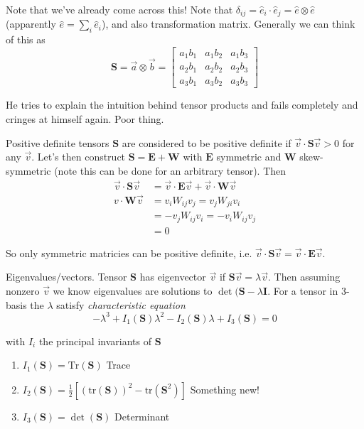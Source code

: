 \documentclass[10pt]{report}
\newcommand{\tr}[0]{\mathrm{tr} }
\begin{document}
Note that we've already come across this! Note that $\delta_{ij} = \hat{e}_i \cdot \hat{e}_j = \hat{e} \otimes \hat{e}$ (apparently $\hat{e} = \sum_{i}^{}\hat{e}_i$), and also transformation matrix. Generally we can think of this as
\begin{equation}
    \mathbf{S} = \vec{a}\otimes \vec{b} = \begin{bmatrix} a_1b_1 & a_1b_2 & a_1b_3\\a_2b_1 & a_2b_2 & a_2b_3\\a_3b_1 & a_3b_2 & a_3b_3 \end{bmatrix} 
\end{equation}

He tries to explain the intuition behind tensor products and fails completely and cringes at himself again. Poor thing.

Positive definite tensors $\mathbf{S}$ are considered to be positive definite if $\vec{v}\cdot \mathbf{S}\vec{v} > 0$ for any $\vec{v}$. Let's then construct $\mathbf{S} = \mathbf{E} + \mathbf{W}$ with $\mathbf{E}$ symmetric and $\mathbf{W}$ skew-symmetric (note this can be done for an arbitrary tensor). Then
\begin{align}
    \vec{v}\cdot\mathbf{S}\vec{v} &= \vec{v}\cdot \mathbf{E}\vec{v} + \vec{v}\cdot\mathbf{W}\vec{v}\\
    v \cdot \mathbf{W}\vec{v} &= v_iW_{ij}v_j = v_jW_{ji}v_i\\
    &= -v_jW_{ij}v_i = -v_iW_{ij}v_j\\
    &= 0
\end{align}

So only symmetric matricies can be positive definite, i.e. $\vec{v} \cdot \mathbf{S}\vec{v} = \vec{v}\cdot \mathbf{E}\vec{v}$. 

Eigenvalues/vectors. Tensor $\mathbf{S}$ has eigenvector $\vec{v}$ if $\mathbf{S}\vec{v} = \lambda\vec{v}$. Then assuming nonzero $\vec{v}$ we know eigenvalues are solutions to $\det(\mathbf{S} - \lambda\mathbf{I}$. For a tensor in 3-basis the $\lambda$ satisfy \emph{characteristic equation}
\begin{equation}
    -\lambda^3 + I_1(\mathbf{S})\lambda^2 - I_2(\mathbf{S})\lambda + I_3(\mathbf{S}) = 0
\end{equation}

with $I_i$ the principal invariants of $\mathbf{S}$
{\small
    \begin{enumerate}
        \item $I_1(\mathbf{S}) = \mathrm{Tr}(\mathbf{S})$ Trace
        \item $I_2(\mathbf{S}) = \frac{1}{2}\left[ (\tr(\mathbf{S}))^2 - \tr(\mathbf{S}^2) \right]$ Something new!
        \item $I_3(\mathbf{S}) = \det(\mathbf{S})$ Determinant
    \end{enumerate}
}
\end{document}
